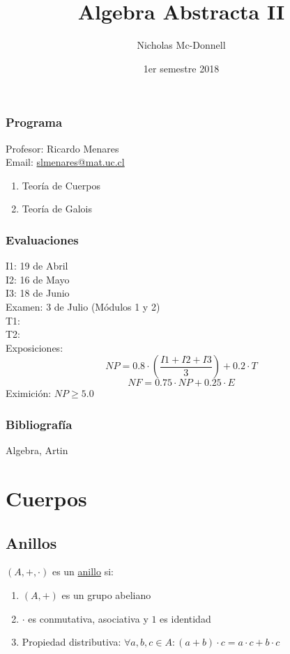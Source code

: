 \documentclass[11pt]{book}
\title{Algebra Abstracta II}
\author{Nicholas Mc-Donnell}
\date{1er semestre 2018}
\begin{document}
    \maketitle

    \section*{Programa}
    {\raggedleft Profesor: Ricardo Menares}\\
    Email: \url{slmenares@mat.uc.cl}
    \begin{enumerate}
        \item Teoría de Cuerpos

        \item Teoría de Galois
    \end{enumerate}

    \section*{Evaluaciones}
    {\raggedleft I1: 19 de Abril}\\
    I2: 16 de Mayo\\
    I3: 18 de Junio\\
    Examen: 3 de Julio (Módulos 1 y 2)\\
    T1:\\
    T2:\\
    Exposiciones:\\

    \[NP = 0.8\cdot\left(\frac{I1+I2+I3}{3}\right)+0.2\cdot T\]
    \[NF = 0.75\cdot NP+0.25\cdot E\]
    Eximición: $NP\geq 5.0$

    \section*{Bibliografía}
    Algebra, Artin

    \newpage

    \tableofcontents

    \part{Cuerpos}
    \chapter{Anillos}
    \begin{defn}[Anillo]
        $(A,+,\cdot)$ es un \underline{anillo} si:
        \begin{enumerate}
            \item $(A,+)$ es un grupo abeliano

            \item $\cdot$ es conmutativa, asociativa y $1$ es identidad

            \item Propiedad distributiva: $\forall a,b,c\in A: (a+b)\cdot c=a\cdot c+ b\cdot c$
        \end{enumerate}
    \end{defn}
\end{document}
